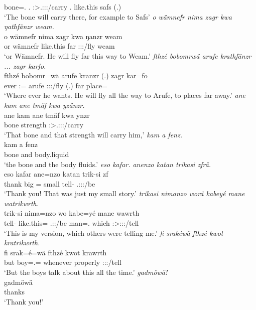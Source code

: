 \begin{exe}
	bone=\Erg.\Sg{} \Third.\Abs{} \Dem{} \Fut{} \Stsg:\Sbj>\Tsg.\Masc:\Obj:\Nonpast:\Ipfv/carry \Med.\All{} like.this safs (.)\\
	\trans `The bone will carry there, for example to Safs'
	\emph{o wämnefr nima zagr kwa ŋathfänzr weam.}\\
	\gll o wämnefr nima zagr kwa ŋanzr weam\\
	or wämnefr like.this far \Fut{} \Stsg:\Sbj:\Nonpast:\Ipfv/fly weam\\
	\trans `or Wämnefr. He will fly far this way to Weam.'
	\emph{fthzé bobomrwä arufe krathfänzr ... zagr karfo.}\\
	\gll fthzé bobomr=wä arufe kranzr (.) zagr kar=fo\\
	ever \Med:\All=\Emph{} arufe \Stsg:\Sbj:\Irr:\Ipfv/fly (.) far place=\Loc\\
	\trans `Where ever he wants. He will fly all the way to Arufe, to places far away.'
	\emph{ane kam ane tmäf kwa yzänzr.}\\
	\gll ane kam ane tmäf kwa ynzr\\
	\Dem{} bone \Dem{} strength \Fut{} \Stsg:\Sbj>\Tsg.\Masc:\Obj:\Nonpast:\Ipfv/carry\\
	\trans `That bone and that strength will carry him,'
	\emph{kam a fenz.}\\
	\gll kam a fenz\\
	bone and body.liquid\\
	\trans `the bone and the body fluids.'
	\emph{eso kafar. anenzo katan trikasi zfrä.}\\
	\gll eso kafar ane=nzo katan trik-si zf\\
	thank big \Dem=\Only{} small tell-\Nmlz{} \Tsg.\F:\Sbj:\Rpst:\Ipfv/be\\
	\trans `Thank you! That was just my small story.'
	\emph{trikasi nimanzo worä kabeyé mane watrikwrth.}\\
	\gll trik-si nima=nzo wo kabe=yé mane wawrth\\
	tell-\Nmlz{} like.this=\Only{} \Fsg.\Sbj:\Nonpast:\Ipfv/be man=\Erg.\Nsg{} which \Stpl:\Sbj>\Fsg:\Io:\Nonpast:\Ipfv/tell\\
	\trans `This is my version, which others were telling me.'
	\emph{fi srakéwä fthzé kwot kratrikwrth.}\\
	\gll fi srak=é=wä fthzé kwot krawrth\\
	but boy=\Erg.\Nsg=\Emph{} whenever properly \Stpl:\Sbj:\Irr:\Ipfv/tell\\
	\trans `But the boys talk about this all the time.'
	\emph{gadmöwä!}\\
	\gll gadmöwä\\
	thanks\\
	\trans `Thank you!'
\end{exe}%